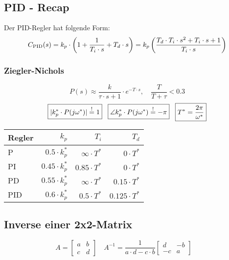 \subsection{PID - Recap}
    Der PID-Regler hat folgende Form:
    \begin{equation*}
        C_{\textnormal{PID}}(s) = k_p\cdot\left(1 + \frac{1}{T_i\cdot s} + T_d\cdot s\right) = k_p\left(\frac{T_d\cdot T_i\cdot s^2 + T_i\cdot s + 1}{T_i\cdot s}\right)
    \end{equation*}
    
    \subsubsection{Ziegler-Nichols}
    \begin{equation*}
        P(s) \approx \frac{k}{\tau\cdot s + 1}\cdot e^{-T\cdot s}, \quad \frac{T}{T+\tau} < 0.3
    \end{equation*}
        \begin{equation*}
            \boxed{|k_p^* \cdot P(j\omega^*)| \overset{!}{=} 1} \hspace{3mm}
            \boxed{\angle k_p^* \cdot P(j\omega^*)\overset{!}{=}-\pi} \hspace{3mm}
            \boxed{T^* =\frac{2\pi}{\omega^*}}
        \end{equation*}
        \begin{center}
        {\renewcommand{\arraystretch}{1.2}
            \begin{tabular}{l r r r}
            Regler & $k_p$ & $T_i$ & $T_d$ \\
                 \hline
                P & $0.5\cdot k_p^*$ & $\infty \cdot T^*$ & $0 \cdot T^*$ \\
                PI & $0.45\cdot k_p^*$ & $0.85\cdot T^*$ & $0 \cdot T^*$\\
                PD & $0.55 \cdot k_p^* $& $\infty \cdot T^*$ &  $0.15\cdot T^*$\\
                PID & $0.6\cdot k_p^*$ & $0.5 \cdot T^*$ & $0.125 \cdot T^*$\\
            \end{tabular}}
        \end{center}

\subsection{Inverse einer 2x2-Matrix}
    \begin{equation*}
        A = \begin{bmatrix} a & b \\ c & d \end{bmatrix}\quad
        A^{-1} = \frac{1}{a\cdot d - c\cdot b}\begin{bmatrix} d & -b \\ -c & a \end{bmatrix}\quad
    \end{equation*}
